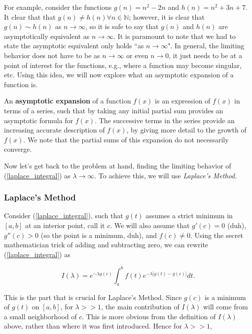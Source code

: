 For example, consider the functions $g(n) = n^2 - 2n$ and $h(n) = n^2 + 3n + 7$. It clear that that $g(n)\neq h(n) \forall n\in\mathbb{N}$; however, it is clear that $g(n)\sim h(n)$ as $n\rightarrow\infty$, so it is safe to say that $g(n)$ and $h(n)$ are asymptotically equivalent as $n\rightarrow\infty.$ It is paramount to note that we had to state the asymptotic equivalent only holds ``as $n\rightarrow\infty$". In general, the limiting behavior does not have to be as $n\rightarrow\infty$ or even $n\rightarrow0$, it just needs to be at a point of interest for the functions, e.g., where a function may become singular, etc.  Using this idea, we will now explore what an asymptotic expansion of a function is. 

\begin{definition}
An \textbf{asymptotic expansion} of a function $f(x)$ is an expression of $f(x)$ in terms of a series, such that by taking any initial partial sum provides an asymptotic formula for $f(x)$. The successive terms in the series provide an increasing accurate description of $f(x)$, by giving more detail to the growth of $f(x)$. We note that the partial sums of this expansion do not necessarily converge. 
\end{definition} 

Now let's get back to the problem at hand, finding the limiting behavior of (\ref{laplace_integral}) as $\lambda\rightarrow\infty$. To achieve this, we will use \emph{Laplace's Method}.

%
%
\subsubsection{Laplace's Method}

Consider (\ref{laplace_integral}), such that $g(t)$ assumes a strict minimum in $[a,b]$ at an interior point, call it $c$. We will also assume that $g'(c)=0$ (duh), $g''(c)>0$ (so the point is a minimum, duh), and $f(c)\neq 0$. Using the secret mathematician trick of adding and subtracting zero, we can rewrite (\ref{laplace_integral}) as

$$I(\lambda) = e^{-\lambda g(c)} \int_a^b f(t) e^{ -\lambda\big[ g(t) - g(c) \big] } dt.$$

This is the part that is crucial for Laplace's Method. Since $g(c)$ is a minimum of $g(t)$ on $[a,b]$, for $\lambda>>1$, the main contribution of $I(\lambda)$ will come from a small neighborhood of $c$. This is more obvious from the definition of $I(\lambda)$ above, rather than where it was first introduced. Hence for $\lambda>>1$, 

